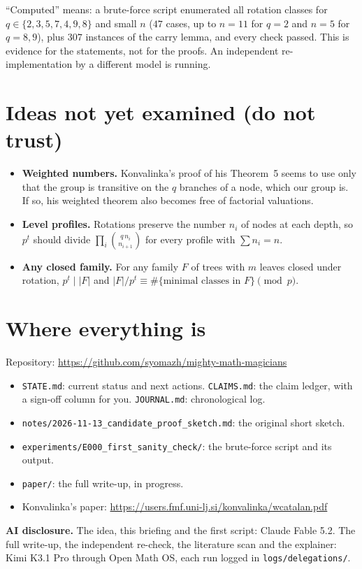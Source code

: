 \documentclass[11pt]{article}
\theoremstyle{definition}
\begin{document}
``Computed'' means: a brute-force script enumerated all rotation classes for
$q\in\{2,3,5,7,4,9,8\}$ and small $n$ ($47$ cases, up to $n=11$ for $q=2$ and $n=5$ for
$q=8,9$), plus $307$ instances of the carry lemma, and every check passed. This is evidence
for the statements, not for the proofs. An independent re-implementation by a different
model is running.

\section{Ideas not yet examined (do not trust)}

\begin{itemize}
\item \textbf{Weighted numbers.} Konvalinka's proof of his Theorem~5 seems to use only that
      the group is transitive on the $q$ branches of a node, which our group is. If so, his
      weighted theorem also becomes free of factorial valuations.
\item \textbf{Level profiles.} Rotations preserve the number $n_i$ of nodes at each depth, so
      $p^t$ should divide $\prod_i\binom{q\,n_i}{n_{i+1}}$ for every profile with $\sum n_i=n$.
\item \textbf{Any closed family.} For any family $F$ of trees with $m$ leaves closed under
      rotation, $p^t\mid|F|$ and $|F|/p^t\equiv\#\{\text{minimal classes in }F\}\pmod p$.
\end{itemize}

\section{Where everything is}

Repository: \url{https://github.com/syomazh/mighty-math-magicians}
\begin{itemize}
\item \texttt{STATE.md}: current status and next actions. \texttt{CLAIMS.md}: the claim
      ledger, with a sign-off column for you. \texttt{JOURNAL.md}: chronological log.
\item \texttt{notes/2026-11-13\_candidate\_proof\_sketch.md}: the original short sketch.
\item \texttt{experiments/E000\_first\_sanity\_check/}: the brute-force script and its output.
\item \texttt{paper/}: the full write-up, in progress.
\item Konvalinka's paper: \url{https://users.fmf.uni-lj.si/konvalinka/wcatalan.pdf}
\end{itemize}

\textbf{AI disclosure.} The idea, this briefing and the first script: Claude Fable 5.2.
The full write-up, the independent re-check, the literature scan and the explainer: Kimi K3.1
Pro through Open Math OS, each run logged in \texttt{logs/delegations/}.
\end{document}
